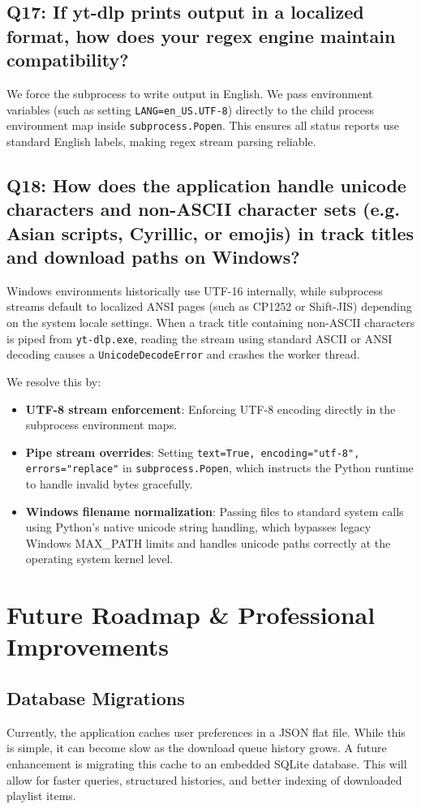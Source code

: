 \documentclass[12pt]{report}
\begin{document}
\section[Question 17]{Q17: If yt-dlp prints output in a localized format, how does your regex engine maintain compatibility?}
We force the subprocess to write output in English. We pass environment variables (such as setting \texttt{LANG=en\_US.UTF-8}) directly to the child process environment map inside \texttt{subprocess.Popen}. This ensures all status reports use standard English labels, making regex stream parsing reliable.

\section[Question 18]{Q18: How does the application handle unicode characters and non-ASCII character sets (e.g. Asian scripts, Cyrillic, or emojis) in track titles and download paths on Windows?}
Windows environments historically use UTF-16 internally, while subprocess streams default to localized ANSI pages (such as CP1252 or Shift-JIS) depending on the system locale settings. When a track title containing non-ASCII characters is piped from \texttt{yt-dlp.exe}, reading the stream using standard ASCII or ANSI decoding causes a \texttt{UnicodeDecodeError} and crashes the worker thread.

We resolve this by:
\begin{itemize}[leftmargin=*]
    \item \textbf{UTF-8 stream enforcement}: Enforcing UTF-8 encoding directly in the subprocess environment maps.
    \item \textbf{Pipe stream overrides}: Setting \texttt{text=True, encoding="utf-8", errors="replace"} in \texttt{subprocess.Popen}, which instructs the Python runtime to handle invalid bytes gracefully.
    \item \textbf{Windows filename normalization}: Passing files to standard system calls using Python's native unicode string handling, which bypasses legacy Windows MAX\_PATH limits and handles unicode paths correctly at the operating system kernel level.
\end{itemize}

\newpage
\chapter{Future Roadmap \& Professional Improvements}

\section{Database Migrations}
Currently, the application caches user preferences in a JSON flat file. While this is simple, it can become slow as the download queue history grows. A future enhancement is migrating this cache to an embedded SQLite database. This will allow for faster queries, structured histories, and better indexing of downloaded playlist items.
\end{document}
